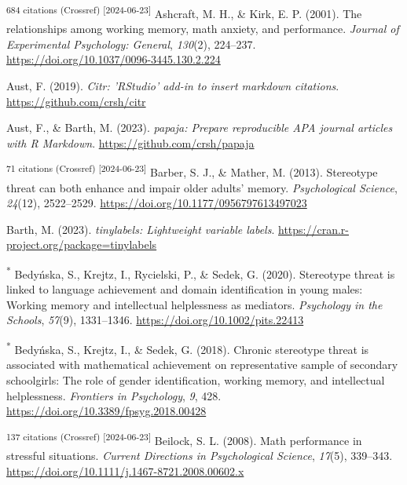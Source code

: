 \documentclass[
  stu, a4paper,floatsintext]{apa7}
\newlength{\cslhangindent}
\newenvironment{CSLReferences}[2] %
 {\begin{list}{}{%
  \setlength{\itemindent}{0pt}
  \setlength{\leftmargin}{0pt}
  \setlength{\parsep}{0pt}
  \ifodd #1
   \setlength{\leftmargin}{\cslhangindent}
   \setlength{\itemindent}{-1\cslhangindent}
  \fi
  \setlength{\itemsep}{#2\baselineskip}}}
 {\end{list}}
\begin{document}
\begin{CSLReferences}{1}{0}
\textsuperscript{684 citations (Crossref) {[}2024-06-23{]}} Ashcraft, M. H., \& Kirk, E. P. (2001). The relationships among working memory, math anxiety, and performance. \emph{Journal of Experimental Psychology: General}, \emph{130}(2), 224--237. \url{https://doi.org/10.1037/0096-3445.130.2.224}

Aust, F. (2019). \emph{Citr: 'RStudio' add-in to insert markdown citations}. \url{https://github.com/crsh/citr}

Aust, F., \& Barth, M. (2023). \emph{{papaja}: {Prepare} reproducible {APA} journal articles with {R Markdown}}. \url{https://github.com/crsh/papaja}

\textsuperscript{71 citations (Crossref) {[}2024-06-23{]}} Barber, S. J., \& Mather, M. (2013). Stereotype threat can both enhance and impair older adults' memory. \emph{Psychological Science}, \emph{24}(12), 2522--2529. \url{https://doi.org/10.1177/0956797613497023}

Barth, M. (2023). \emph{{tinylabels}: Lightweight variable labels}. \url{https://cran.r-project.org/package=tinylabels}

\textsuperscript{*} Bedyńska, S., Krejtz, I., Rycielski, P., \& Sedek, G. (2020). Stereotype threat is linked to language achievement and domain identification in young males: {Working} memory and intellectual helplessness as mediators. \emph{Psychology in the Schools}, \emph{57}(9), 1331--1346. \url{https://doi.org/10.1002/pits.22413}

\textsuperscript{*} Bedyńska, S., Krejtz, I., \& Sedek, G. (2018). Chronic stereotype threat is associated with mathematical achievement on representative sample of secondary schoolgirls: {The} role of gender identification, working memory, and intellectual helplessness. \emph{Frontiers in Psychology}, \emph{9}, 428. \url{https://doi.org/10.3389/fpsyg.2018.00428}

\textsuperscript{137 citations (Crossref) {[}2024-06-23{]}} Beilock, S. L. (2008). Math performance in stressful situations. \emph{Current Directions in Psychological Science}, \emph{17}(5), 339--343. \url{https://doi.org/10.1111/j.1467-8721.2008.00602.x}


\end{CSLReferences}
\end{document}
